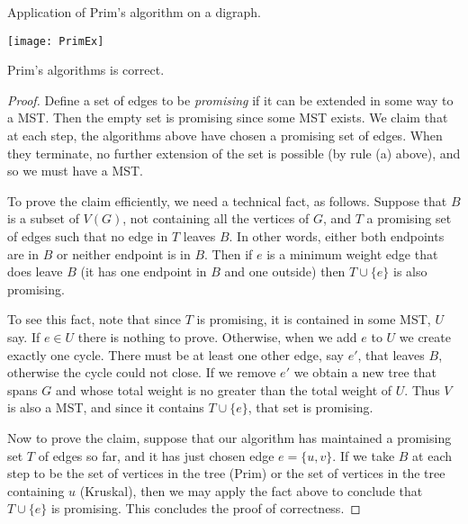 \begin{Boxample}
Application of Prim's algorithm on a digraph.
\begin{center}
\texttt{[image: PrimEx]}
\end{center}
\end{Boxample}


\begin{Theorem}
\label{thm:prim}
Prim's algorithms is correct.
\end{Theorem}

\begin{proof}
Define a set of edges to be \emph{promising} if it can be
extended in some way to a MST. Then the empty set is promising since
some MST exists. We claim that at each step, the algorithms above have
chosen a promising set of edges. When they terminate, no further
extension of the set  is possible (by rule (a) above), and so we must
have a MST.

To prove the claim efficiently, we need a technical fact, as follows.
Suppose that $B$ is a subset of $V(G)$, not containing all the vertices
of $G$, and $T$ a promising set of edges such that no edge in $T$ leaves
$B$. In other words, either both endpoints are in $B$ or neither
endpoint is in $B$. Then if $e$ is a minimum weight edge that does leave
$B$ (it has one endpoint in $B$ and one outside) then $T\cup\{e\}$ is
also promising.

To see this fact, note that since $T$ is promising, it is contained in
some MST, $U$ say. If $e\in U$ there is nothing to prove. Otherwise,
when we add $e$ to $U$ we create exactly one cycle. There must be at
least one other edge, say $e'$, that leaves $B$, otherwise the cycle
could not close. If we remove $e'$ we obtain a new tree that spans $G$
and whose total weight is no greater than the total weight of $U$. Thus
$V$ is also a MST, and since it contains $T\cup\{e\}$, that set is
promising.

Now to prove the claim, suppose that our algorithm has maintained a
promising set $T$ of edges so far, and it has just chosen edge $e=\{u,v\}$.
If we take $B$ at each step to be the set of vertices in the tree (Prim)
or the set of vertices in the tree containing $u$ (Kruskal), then we may
apply the fact above to conclude that $T \cup \{e\}$ is promising. This
concludes the proof of correctness.
\end{proof}

